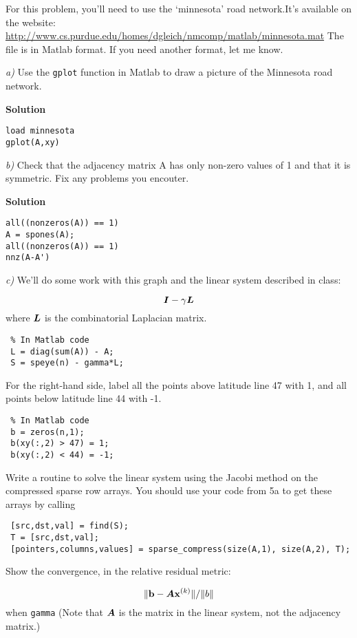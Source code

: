 \documentclass{article}
\begin{document}
For this problem, you'{}ll need to use the `{}minnesota'{} road network.\newline It'{}s available on the website: \url{http://www.cs.purdue.edu/homes/dgleich/nmcomp/matlab/minnesota.mat} The file is in Matlab format. If you need another format, let me know.

\emph{a)} Use the {\colorbox[rgb]{1.00,0.93,1.00}{\tt gplot}} function in Matlab to draw a picture of the Minnesota road network.

\textbf{Solution}

\begin{verbatim}load minnesota
gplot(A,xy)\end{verbatim}
\emph{b)} Check that the adjacency matrix A has only non-zero values of 1 and that it is symmetric. Fix any problems you encouter.

\textbf{Solution}

\begin{verbatim}all((nonzeros(A)) == 1)
A = spones(A);
all((nonzeros(A)) == 1)
nnz(A-A')\end{verbatim}
\emph{c)} We'{}ll do some work with this graph and the linear system described in class:

\begin{displaymath}
\boldsymbol{I} - \gamma \boldsymbol{L}
\end{displaymath}
where $\boldsymbol{L}$ is the combinatorial Laplacian matrix.

\begin{verbatim} % In Matlab code
 L = diag(sum(A)) - A;
 S = speye(n) - gamma*L;\end{verbatim}
For the right-hand side, label all the points above latitude line 47 with 1, and all points below latitude line 44 with -1.

\begin{verbatim} % In Matlab code
 b = zeros(n,1);
 b(xy(:,2) > 47) = 1;
 b(xy(:,2) < 44) = -1;\end{verbatim}
Write a routine to solve the linear system using the Jacobi method on the compressed sparse row arrays. You should use your code from 5a to get these arrays by calling

\begin{verbatim} [src,dst,val] = find(S); 
 T = [src,dst,val];
 [pointers,columns,values] = sparse_compress(size(A,1), size(A,2), T);\end{verbatim}
Show the convergence, in the relative residual metric:

\begin{displaymath}
\|\boldsymbol{\mathrm{b}} - \boldsymbol{A} \boldsymbol{\mathrm{x}}^{(k)}\|/\|b\|
\end{displaymath}
when {\colorbox[rgb]{1.00,0.93,1.00}{\tt gamma}} (Note that $\boldsymbol{A}$ is the matrix in the linear system, not the adjacency matrix.)
\end{document}
